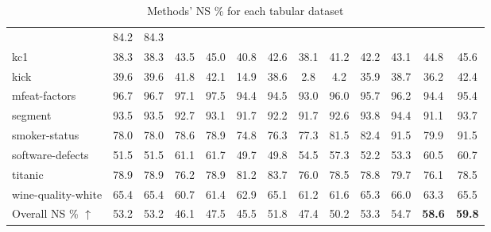 \begin{table}[h!]
{\begin{tabularx}{1.12\textwidth}{>{\scriptsize}l*{12}{c}}
 & 84.2 & 84.3\\
kc1 & 38.3 & 38.3 & 43.5 & 45.0 & 40.8 & 42.6 & 38.1 & 41.2 & 42.2 & 43.1 & 44.8 & 45.6 \\
kick & 39.6 & 39.6 & 41.8 & 42.1 & 14.9 & 38.6 & 2.8 & 4.2 & 35.9 & 38.7 & 36.2 & 42.4 \\
mfeat-factors & 96.7 & 96.7 & 97.1 & 97.5 & 94.4 & 94.5 & 93.0 & 96.0 & 95.7 & 96.2 & 94.4 & 95.4\\
segment & 93.5 & 93.5 & 92.7 & 93.1 & 91.7 & 92.2 & 91.7 & 92.6 & 93.8 & 94.4 & 91.1 & 93.7\\
smoker-status & 78.0 & 78.0 & 78.6 & 78.9 & 74.8 & 76.3 & 77.3 & 81.5 & 82.4 & 91.5 & 79.9 & 91.5\\
software-defects & 51.5 & 51.5 & 61.1 & 61.7 & 49.7 & 49.8 & 54.5 & 57.3 & 52.2 & 53.3 & 60.5 & 60.7\\
titanic & 78.9 & 78.9 & 76.2 & 78.9 & 81.2 & 83.7 & 76.0 & 78.5 & 78.8 & 79.7 & 76.1 & 78.5\\
wine-quality-white & 65.4 & 65.4 & 60.7 & 61.4 & 62.9 & 65.1 & 61.2 & 61.6 & 65.3 & 66.0 & 63.3 & 65.5 \\
\midrule
\normalsize Overall NS \% $\uparrow$ & 53.2 & 53.2 & 46.1 & 47.5  & 45.5 & 51.8 & 47.4 & 50.2 & 53.3 & 54.7 & \textbf{58.6} & \textbf{59.8} \\
\bottomrule
\end{tabularx}
}
\caption{Methods' NS \% for each tabular dataset}
\label{table:full-main-results}
\end{table}